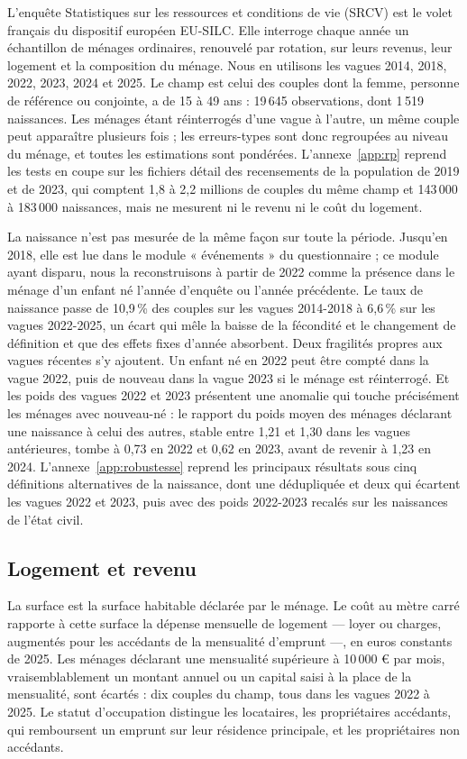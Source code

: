 \documentclass[11pt,a4paper]{article}
\theoremstyle{plain}
\theoremstyle{definition}
\theoremstyle{remark}
\begin{document}
L'enquête Statistiques sur les ressources et conditions de vie (SRCV) est le volet français du dispositif européen EU-SILC. Elle interroge chaque année un échantillon de ménages ordinaires, renouvelé par rotation, sur leurs revenus, leur logement et la composition du ménage. Nous en utilisons les vagues 2014, 2018, 2022, 2023, 2024 et 2025. Le champ est celui des couples dont la femme, personne de référence ou conjointe, a de 15 à 49 ans : 19\,645 observations, dont 1\,519 naissances. Les ménages étant réinterrogés d'une vague à l'autre, un même couple peut apparaître plusieurs fois ; les erreurs-types sont donc regroupées au niveau du ménage, et toutes les estimations sont pondérées. L'annexe~\ref{app:rp} reprend les tests en coupe sur les fichiers détail des recensements de la population de 2019 et de 2023, qui comptent 1,8 à 2,2 millions de couples du même champ et 143\,000 à 183\,000 naissances, mais ne mesurent ni le revenu ni le coût du logement.

La naissance n'est pas mesurée de la même façon sur toute la période. Jusqu'en 2018, elle est lue dans le module « événements » du questionnaire ; ce module ayant disparu, nous la reconstruisons à partir de 2022 comme la présence dans le ménage d'un enfant né l'année d'enquête ou l'année précédente. Le taux de naissance passe de 10,9\,\% des couples sur les vagues 2014-2018 à 6,6\,\% sur les vagues 2022-2025, un écart qui mêle la baisse de la fécondité et le changement de définition et que des effets fixes d'année absorbent. Deux fragilités propres aux vagues récentes s'y ajoutent. Un enfant né en 2022 peut être compté dans la vague 2022, puis de nouveau dans la vague 2023 si le ménage est réinterrogé. Et les poids des vagues 2022 et 2023 présentent une anomalie qui touche précisément les ménages avec nouveau-né : le rapport du poids moyen des ménages déclarant une naissance à celui des autres, stable entre 1,21 et 1,30 dans les vagues antérieures, tombe à 0,73 en 2022 et 0,62 en 2023, avant de revenir à 1,23 en 2024. L'annexe~\ref{app:robustesse} reprend les principaux résultats sous cinq définitions alternatives de la naissance, dont une dédupliquée et deux qui écartent les vagues 2022 et 2023, puis avec des poids 2022-2023 recalés sur les naissances de l'état civil.

\subsection{Logement et revenu}

La surface est la surface habitable déclarée par le ménage. Le coût au mètre carré rapporte à cette surface la dépense mensuelle de logement — loyer ou charges, augmentés pour les accédants de la mensualité d'emprunt —, en euros constants de 2025. Les ménages déclarant une mensualité supérieure à 10\,000 € par mois, vraisemblablement un montant annuel ou un capital saisi à la place de la mensualité, sont écartés : dix couples du champ, tous dans les vagues 2022 à 2025. Le statut d'occupation distingue les locataires, les propriétaires accédants, qui remboursent un emprunt sur leur résidence principale, et les propriétaires non accédants.
\end{document}
